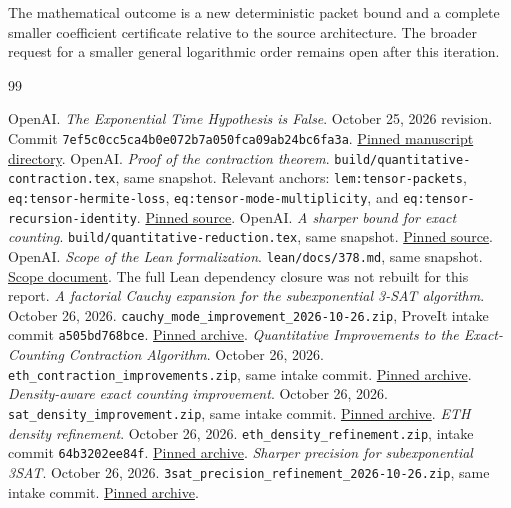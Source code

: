 \documentclass[11pt,letterpaper]{article}
\numberwithin{equation}{section}
\theoremstyle{definition}\newtheorem{definition}[theorem]{Definition}
\theoremstyle{remark}\newtheorem{remark}[theorem]{Remark}
\newcommand{\srcsha}{\texttt{7ef5c0cc5ca4b0e072b7a050fca09ab24bc6fa3a}}
\newcommand{\upstream}{https://github.com/openai/math/blob/7ef5c0cc5ca4b0e072b7a050fca09ab24bc6fa3a/}
\newcommand{\incoming}{https://github.com/VladimirReshetnikov/ProveIt/blob/aa6933442eb936962de79ba6d321cd0391c450bd/docs/incoming/}
\begin{document}
The mathematical outcome is a new deterministic packet bound and a complete smaller coefficient certificate relative to the source architecture. The broader request for a smaller general logarithmic order remains open after this iteration.

\begin{thebibliography}{99}
\small\raggedright
{} OpenAI. \emph{The Exponential Time Hypothesis is False}. October 25, 2026 revision. Commit \srcsha. \href{https://github.com/openai/math/tree/7ef5c0cc5ca4b0e072b7a050fca09ab24bc6fa3a/preprints/The-Exponential-Time-Hypothesis-is-False-October-25-2026}{Pinned manuscript directory}.
 OpenAI. \emph{Proof of the contraction theorem}. \texttt{build/quantitative-contraction.tex}, same snapshot. Relevant anchors: \texttt{lem:tensor-packets}, \texttt{eq:tensor-hermite-loss}, \texttt{eq:tensor-mode-multiplicity}, and \texttt{eq:tensor-recursion-identity}. \href{\upstream preprints/The-Exponential-Time-Hypothesis-is-False-October-25-2026/build/quantitative-contraction.tex}{Pinned source}.
 OpenAI. \emph{A sharper bound for exact counting}. \texttt{build/quantitative-reduction.tex}, same snapshot. \href{\upstream preprints/The-Exponential-Time-Hypothesis-is-False-October-25-2026/build/quantitative-reduction.tex}{Pinned source}.
 OpenAI. \emph{Scope of the Lean formalization}. \texttt{lean/docs/378.md}, same snapshot. \href{\upstream lean/docs/378.md}{Scope document}. The full Lean dependency closure was not rebuilt for this report.
 \emph{A factorial Cauchy expansion for the subexponential 3-SAT algorithm}. October 26, 2026. \texttt{cauchy\_mode\_improvement\_2026-10-26.zip}, ProveIt intake commit \texttt{a505bd768bce}. \href{\incoming cauchy_mode_improvement_2026-10-26.zip}{Pinned archive}.
 \emph{Quantitative Improvements to the Exact-Counting Contraction Algorithm}. October 26, 2026. \texttt{eth\_contraction\_improvements.zip}, same intake commit. \href{\incoming eth_contraction_improvements.zip}{Pinned archive}.
 \emph{Density-aware exact counting improvement}. October 26, 2026. \texttt{sat\_density\_improvement.zip}, same intake commit. \href{\incoming sat_density_improvement.zip}{Pinned archive}.
 \emph{ETH density refinement}. October 26, 2026. \texttt{eth\_density\_refinement.zip}, intake commit \texttt{64b3202ee84f}. \href{\incoming eth_density_refinement.zip}{Pinned archive}.
 \emph{Sharper precision for subexponential 3SAT}. October 26, 2026. \texttt{3sat\_precision\_refinement\_2026-10-26.zip}, same intake commit. \href{\incoming 3sat_precision_refinement_2026-10-26.zip}{Pinned archive}.

\end{thebibliography}
\end{document}
